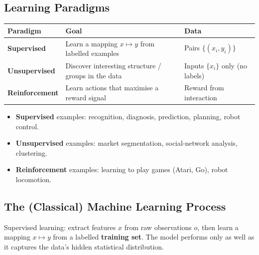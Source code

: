 \documentclass[10pt,a4paper]{article}
\begin{document}
	\subsection{Learning Paradigms}

	\begin{center}
		\begin{tabular}{p{2.6cm} p{6cm} p{5.2cm}}
			\toprule
			Paradigm & Goal & Data \\
			\midrule
			\textbf{Supervised}   & Learn a mapping $x \mapsto y$ from labelled examples & Pairs $\{(x_i, y_i)\}$ \\
			\textbf{Unsupervised} & Discover interesting structure / groups in the data & Inputs $\{x_i\}$ only (no labels) \\
			\textbf{Reinforcement}& Learn actions that maximise a reward signal & Reward from interaction \\
			\bottomrule
		\end{tabular}
	\end{center}

	\begin{itemize}[leftmargin=*]
		\item \textbf{Supervised} examples: recognition, diagnosis, prediction, planning, robot control.
		\item \textbf{Unsupervised} examples: market segmentation, social-network analysis, clustering.
		\item \textbf{Reinforcement} examples: learning to play games (Atari, Go), robot locomotion.
	\end{itemize}

	\subsection{The (Classical) Machine Learning Process}

	\begin{definitionbox}
		Supervised learning: extract features $x$ from raw observations $o$, then learn a mapping $x \mapsto y$ from a labelled \textbf{training set}. The model performs only as well as it captures the data's hidden statistical distribution.
	\end{definitionbox}
\end{document}
